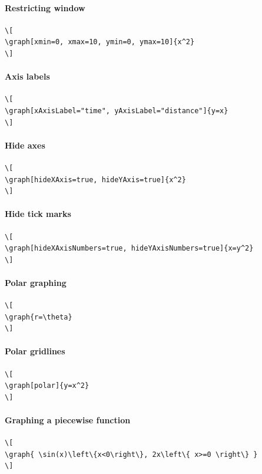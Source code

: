 \documentclass{ximera}
\begin{document}
\paragraph{Restricting window}

  
\begin{verbatim}
\[
\graph[xmin=0, xmax=10, ymin=0, ymax=10]{x^2}
\]
\end{verbatim}
\paragraph{Axis labels}

  
\begin{verbatim}
\[
\graph[xAxisLabel="time", yAxisLabel="distance"]{y=x}
\]
\end{verbatim}
\paragraph{Hide axes}

  
\begin{verbatim}
\[
\graph[hideXAxis=true, hideYAxis=true]{x^2}
\]
\end{verbatim}
\paragraph{Hide tick marks}

  
\begin{verbatim}
\[
\graph[hideXAxisNumbers=true, hideYAxisNumbers=true]{x=y^2}
\]
\end{verbatim}
\paragraph{Polar graphing}

  
\begin{verbatim}
\[
\graph{r=\theta}
\]
\end{verbatim}
\paragraph{Polar gridlines}


\begin{verbatim}
\[
\graph[polar]{y=x^2}
\]
\end{verbatim}
\paragraph{Graphing a piecewise function}


\begin{verbatim}
\[
\graph{ \sin(x)\left\{x<0\right\}, 2x\left\{ x>=0 \right\} }
\]
\end{verbatim}
\end{document}
